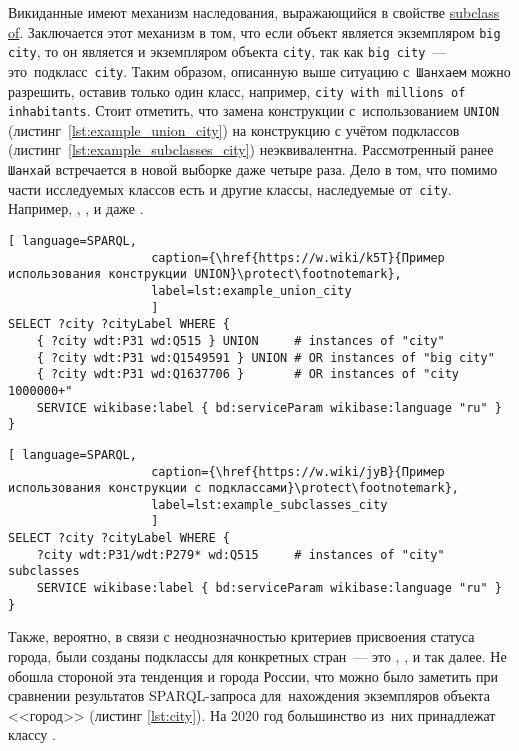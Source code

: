 Викиданные имеют механизм наследования, 
выражающийся в свойстве \href{https://www.wikidata.org/wiki/Property:P279}{subclass of}. 
Заключается этот механизм в том, что если объект является экземпляром \lstinline{big city}, 
то он является и экземпляром объекта \lstinline{city}, 
так как \lstinline|big city|~--- это~подкласс~\lstinline|city|. 
Таким образом, описанную выше ситуацию с~\lstinline|Шанхаем| можно разрешить, 
оставив только один класс, например, \mbox{\lstinline{city with millions of inhabitants}}. 
Стоит отметить, что замена конструкции 
с~использованием \lstinline|UNION| (листинг~\ref{lst:example_union_city}) 
на конструкцию с учётом подклассов (листинг~\ref{lst:example_subclasses_city})
неэквивалентна. 
Рассмотренный ранее \lstinline|Шанхай| встречается в новой выборке даже четыре раза. 
Дело в том, что помимо части исследуемых классов есть и другие классы, наследуемые от~\lstinline|city|. 
Например, , 
, 
 и даже .

\begin{lstlisting}[ language=SPARQL, 
                    caption={\href{https://w.wiki/k5T}{Пример использования конструкции UNION}\protect\footnotemark},
                    label=lst:example_union_city
                    ]
SELECT ?city ?cityLabel WHERE {
    { ?city wdt:P31 wd:Q515 } UNION     # instances of "city"            
    { ?city wdt:P31 wd:Q1549591 } UNION # OR instances of "big city"               
    { ?city wdt:P31 wd:Q1637706 }       # OR instances of "city 1000000+"
    SERVICE wikibase:label { bd:serviceParam wikibase:language "ru" }
}
\end{lstlisting}

\begin{lstlisting}[ language=SPARQL, 
                    caption={\href{https://w.wiki/jyB}{Пример использования конструкции с подклассами}\protect\footnotemark},
                    label=lst:example_subclasses_city
                    ]
SELECT ?city ?cityLabel WHERE {
    ?city wdt:P31/wdt:P279* wd:Q515     # instances of "city" subclasses
    SERVICE wikibase:label { bd:serviceParam wikibase:language "ru" }
}
\end{lstlisting}

Также, вероятно, в связи с неоднозначностью критериев присвоения статуса города, 
были созданы подклассы для конкретных стран~--- это , 
,  и так далее. 
Не обошла стороной эта тенденция и города России, 
что можно было заметить при сравнении результатов SPARQL-запроса 
для~нахождения экземпляров объекта <<город>> (листинг \ref{lst:city}). 
На 2020 год большинство из~них принадлежат классу .

